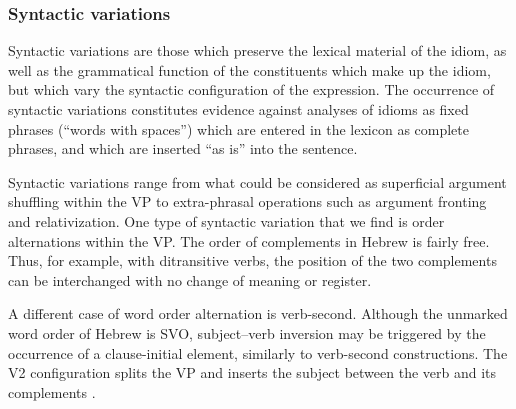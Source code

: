 \documentclass[output=paper]{langsci/langscibook}
\begin{document}
\subsubsection{Syntactic variations}
\label{sec:syn-var}
Syntactic variations are those which preserve the lexical material of the idiom, as well as the grammatical function of the constituents which make up the idiom, but which vary the syntactic configuration of the expression. The occurrence of syntactic variations constitutes evidence against analyses of idioms as fixed phrases (``words with spaces'') which are entered in the lexicon as complete phrases, and which are inserted ``as is'' into the sentence.

Syntactic variations range from what could be considered as superficial argument shuffling within the VP to extra-phrasal operations such as argument fronting and relativization. One type of syntactic variation that we find is order alternations within the VP. The order of complements in Hebrew is fairly free. Thus, for example, with ditransitive verbs, the position of the two complements can be interchanged with no change of meaning or register.

\eal
\zl

A different case of word order alternation is verb-second. Although the unmarked word order of Hebrew is SVO, subject--verb inversion may be triggered by the occurrence of a clause-initial element, similarly to verb-second constructions. The V2 configuration splits the VP and inserts the subject between the verb and its complements .

\eal
\zl
\end{document}

